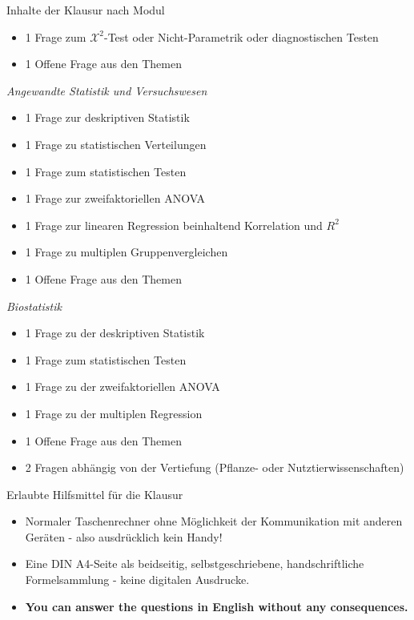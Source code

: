\documentclass[a4paper, 9pt]{scrartcl}\usepackage[]{graphicx}\usepackage[]{xcolor}
\begin{document}
\begin{graybox}{Inhalte der Klausur nach Modul}
\begin{itemize}
  \item 1 Frage zum $\mathcal{X}^2$-Test oder Nicht-Parametrik oder diagnostischen Testen
  \item 1 Offene Frage aus den Themen
  \end{itemize} 
  \textit{Angewandte Statistik und Versuchswesen} 
  \begin{itemize}
  \item 1 Frage zur deskriptiven Statistik
  \item 1 Frage zu statistischen Verteilungen
  \item 1 Frage zum statistischen Testen
  \item 1 Frage zur zweifaktoriellen ANOVA
  \item 1 Frage zur linearen Regression beinhaltend Korrelation und $R^2$
  \item 1 Frage zu multiplen Gruppenvergleichen
  \item 1 Offene Frage aus den Themen
  \end{itemize} 
  \textit{Biostatistik}
  \begin{itemize}
  \item 1 Frage zu der deskriptiven Statistik
  \item 1 Frage zum statistischen Testen
  \item 1 Frage zu der zweifaktoriellen ANOVA
  \item 1 Frage zu der multiplen Regression
  \item 1 Offene Frage aus den Themen
  \item 2 Fragen abh{\"a}ngig von der Vertiefung (Pflanze- oder Nutztierwissenschaften)
  \end{itemize} 
\end{graybox}
\newpage  

\begin{graybox}{Erlaubte Hilfsmittel f{\"u}r die Klausur}
  \vspace{1Ex}
  \begin{itemize}
  \item Normaler Taschenrechner ohne M{\"o}glichkeit der Kommunikation mit anderen
    Ger{\"a}ten - also ausdr{\"u}cklich kein Handy!
  \item Eine DIN A4-Seite als beidseitig, selbstgeschriebene,
    handschriftliche Formelsammlung - keine digitalen Ausdrucke. 
  \item \textbf{You can answer the questions in English without any consequences.}  
  \end{itemize}
\end{graybox}
\vfill
\end{document}
